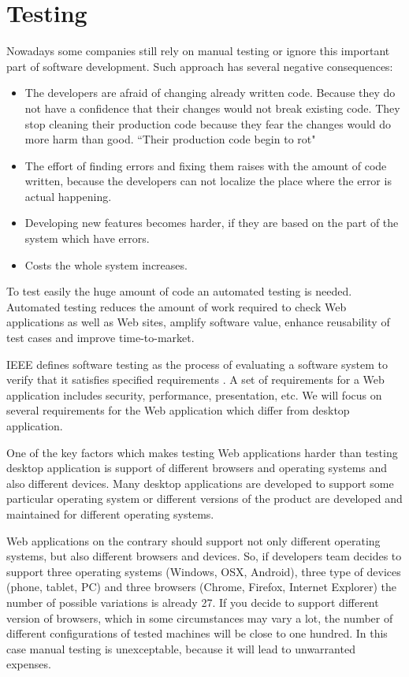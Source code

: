 \section{Testing}
		Nowadays some companies still rely on manual testing or ignore this
		important part of software development. Such approach has several
		negative consequences:
		\begin{itemize}
			\item The developers are afraid of changing already written
			code. Because they do not have a confidence that their changes would not 
			break existing code. They stop cleaning their production code because they
			fear the changes would do more harm than good. ``Their production code begin
			to rot"
			\cite[p.123]{cleancode} 
			
			\item The effort of finding errors and	fixing them raises with the amount of
			code written, because the developers can not localize the place where the
			error is actual happening.
			\item Developing new features becomes harder, if they are based on the part
			of the system which have errors.
		
			\item Costs the whole system increases.
	 	 \end{itemize}
	 	 
	 	 To test easily the huge amount of code an automated testing is needed.	
	 	 Automated testing reduces the amount of work required to check Web applications as
	 	 well as Web sites, amplify software value, enhance reusability of test cases and improve time-to-market.
	   
		IEEE defines software testing as the process of evaluating a software
		system to verify that it satisfies specified requirements \cite{Xu1}. A set of
		requirements for a Web application includes security, performance,
		presentation, etc. We will focus on several requirements for the Web
		application which differ from desktop application. 
		
		One of the key factors which makes testing Web applications harder than
		testing desktop application is support of different browsers and operating systems and also
		different devices. Many desktop applications are developed to support some
		particular operating system or different versions of the product are developed
		and maintained for different operating systems. 
		
		Web applications on the	contrary should support not only different operating systems, but also
		different browsers and devices. So, if developers team decides to support
		three operating systems (Windows, OSX, Android), three type of devices (phone,
		tablet, PC) and three browsers (Chrome, Firefox, Internet Explorer) the number
		of possible variations is already 27. If you decide to support
		different version of browsers, which in some circumstances may vary a lot,
		the number of different configurations of tested machines will be close to
		one hundred. In this case manual testing is unexceptable, because it will lead
		to unwarranted expenses. 
		

